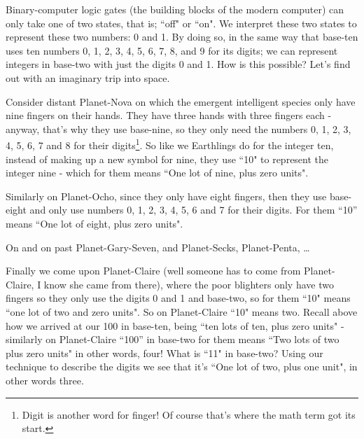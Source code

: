 \documentclass{article}
\begin{document}
Binary-computer logic gates (the building blocks of the modern computer)
can only take one of two states, that is; ``off" or ``on".
We interpret these two states to represent these two numbers: 0 and 1.
By doing so, in the same way that base-ten uses ten numbers 0,
1, 2, 3, 4, 5, 6, 7, 8, and 9 for its digits; we can represent integers
in base-two with just the digits 0 and 1. How is this possible?
Let's find out with an imaginary trip into space.

Consider distant Planet-Nova on which the emergent
intelligent species only have nine fingers on their hands.
They have three hands with three fingers each - anyway,
that's why they use base-nine, so they only need the numbers 0,
1, 2, 3, 4, 5, 6, 7 and 8 for their digits\footnote{Digit
is another word for finger! Of course that's where the math term got its start.}.
So like we Earthlings do for the integer ten,
instead of making up a new symbol for nine,
they use ``10" to represent the integer nine - which
for them means ``One lot of nine, plus zero units".

Similarly on Planet-Ocho, since they only have eight fingers,
then they use base-eight and only use numbers 0, 1,
2, 3, 4, 5, 6 and 7 for their digits. For them ``10''
means ``One lot of eight, plus zero units".

On and on past Planet-Gary-Seven, and Planet-Secks, Planet-Penta, \dots{}

Finally we come upon Planet-Claire (well someone
has to come from Planet-Claire,
I know she came from there),
where the poor blighters only have two fingers
so they only use the digits 0 and 1 and base-two,
so for them ``10" means ``one lot of two and zero units".
So on Planet-Claire ``10" means two.
Recall above how we arrived at our 100 in base-ten,
being ``ten lots of ten,
plus zero units" - similarly on Planet-Claire ``100''
in base-two for them means ``Two lots of two plus zero units" in other words,
four! What is ``11" in base-two? Using our technique to
describe the digits we see that it's ``One lot of two, plus one unit",
in other words three.
\end{document}
